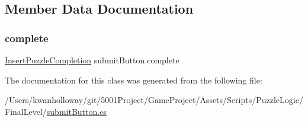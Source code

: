 \subsection{Member Data Documentation}
\mbox{\label{classsubmit_button_a1346ad28f62e29199c2f2fb7859d47cb}} 
\subsubsection{\texorpdfstring{complete}{complete}}
{\footnotesize\ttfamily \hyperlink{class_insert_puzzle_completion}{Insert\+Puzzle\+Completion} submit\+Button.\+complete}



The documentation for this class was generated from the following file\+:\begin{DoxyCompactItemize}
\item 
/\+Users/kwanholloway/git/5001\+Project/\+Game\+Project/\+Assets/\+Scripts/\+Puzzle\+Logic/\+Final\+Level/\hyperlink{submit_button_8cs}{submit\+Button.\+cs}\end{DoxyCompactItemize}

